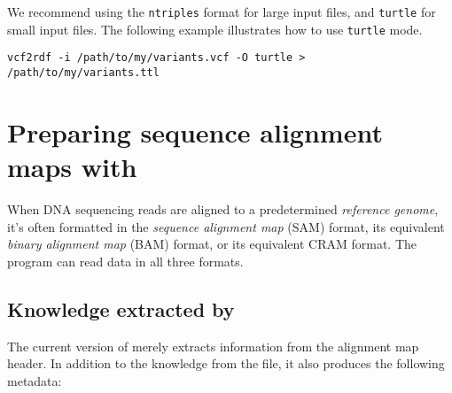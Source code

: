   We recommend using the \texttt{ntriples} format for large input files, and
  \texttt{turtle} for small input files.  The following example illustrates how to
  use \texttt{turtle} mode.

\begin{siderules}
\begin{verbatim}
vcf2rdf -i /path/to/my/variants.vcf -O turtle > /path/to/my/variants.ttl
\end{verbatim}
\end{siderules}

\section{Preparing sequence alignment maps with }

  When DNA sequencing reads are aligned to a predetermined \emph{reference
  genome}, it's often formatted in the \emph{sequence alignment map} (SAM)
  format, its equivalent \emph{binary alignment map} (BAM) format, or its
  equivalent CRAM format.  The  program can read data in all
  three formats.

\subsection{Knowledge extracted by }

  The current version of  merely extracts information from the
  alignment map header.  In addition to the knowledge from the file, it also
  produces the following metadata:

